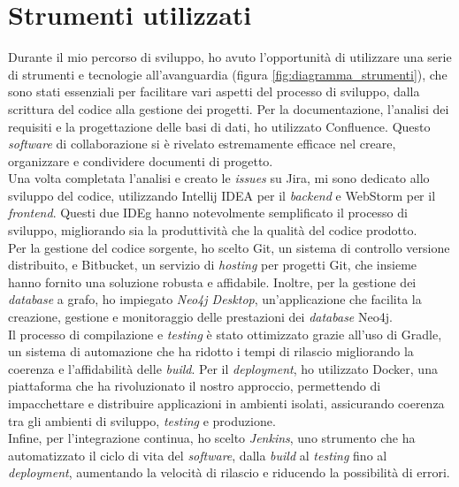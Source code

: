 \section{Strumenti utilizzati}
\noindent Durante il mio percorso di sviluppo, ho avuto l'opportunità di utilizzare una serie di strumenti e tecnologie all'avanguardia (figura \ref*{fig:diagramma_strumenti}), che sono stati essenziali 
per facilitare vari aspetti del processo di sviluppo, dalla scrittura del codice alla gestione dei progetti. 
Per la documentazione, l'analisi dei requisiti e la progettazione delle basi di dati, ho utilizzato Confluence. 
Questo \textit{software} di collaborazione si è rivelato estremamente efficace nel creare, organizzare e condividere documenti di progetto.\\

\noindent Una volta completata l'analisi e creato le \textit{issues} su Jira, mi sono dedicato allo sviluppo del codice, 
utilizzando Intellij IDEA per il \textit{backend} e WebStorm per il \textit{frontend}. 
Questi due \gls{IDEg} hanno notevolmente semplificato il processo di sviluppo, migliorando sia la produttività che la qualità del codice prodotto.\\

\noindent Per la gestione del codice sorgente, ho scelto Git, un sistema di controllo versione distribuito, e Bitbucket, 
un servizio di \textit{hosting} per progetti Git, che insieme hanno fornito una soluzione robusta e affidabile. 
Inoltre, per la gestione dei \textit{database} a grafo, ho impiegato \textit{Neo4j Desktop}, un'applicazione che facilita la creazione, gestione e monitoraggio 
delle prestazioni dei \textit{database} Neo4j.\\

\noindent Il processo di compilazione e \textit{testing} è stato ottimizzato grazie all'uso di Gradle, un sistema di automazione che ha ridotto 
i tempi di rilascio migliorando la coerenza e l'affidabilità delle \textit{build}. Per il \textit{deployment}, ho utilizzato Docker, 
una piattaforma che ha rivoluzionato il nostro approccio, permettendo di impacchettare e distribuire applicazioni in ambienti isolati, assicurando 
coerenza tra gli ambienti di sviluppo, \textit{testing} e produzione.\\

\noindent Infine, per l'integrazione continua, ho scelto \textit{Jenkins}, uno strumento che ha automatizzato il ciclo di vita del \textit{software}, 
dalla \textit{build} al \textit{testing} fino al \textit{deployment}, aumentando la velocità di rilascio e riducendo la possibilità di errori. \\


